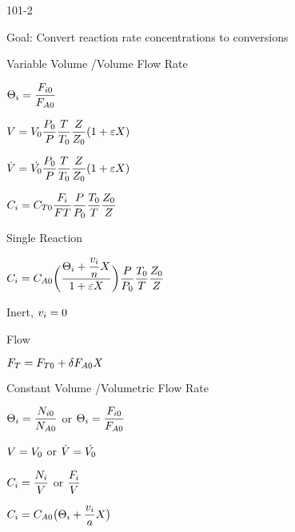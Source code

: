 \begin{mitframe}{101-2}
\begin{listone}
	\item Goal: Convert reaction rate concentrations to conversions
    \item Variable Volume /Volume Flow Rate
    	\begin{listtwo}
        	\item $\dimltemp_{\state}=\dfrac{\force_{\state\init}}{\force_{\helmholtz\init}}$
            \item $\vol=\vol_{\init}\dfrac{\p_{\init}}{\p}\dfrac{\Temp}{\Temp_{\init}}\dfrac{\compress}{\compress_{\init}}(1+\varepsilon{X})$
            \item $\dot{\vol}=\dot{\vol_{\init}}\dfrac{\p_{\init}}{\p}\dfrac{\Temp}{\Temp_{\init}}\dfrac{\compress}{\compress_{\init}}(1+\varepsilon{X})$
            \item $\conc_{\state}=\conc_{\Temp\init}\dfrac{\force_{\state}}{\force\Temp}\dfrac{\p}{\p_{\init}}\dfrac{\Temp_{\init}}{\Temp}\dfrac{\compress_{\init}}{\compress}$
            \begin{listthree}
            		\item Single Reaction
                    \item $\conc_{\state}=\conc_{\helmholtz\init}\bigg(
            \dfrac{\dimltemp_{\state}+\dfrac{\vvel_{\state}}{n}X}{1+\varepsilon{X}}\bigg)\dfrac{\p}{\p_{\init}}\dfrac{\Temp_{\init}}{\Temp}\dfrac{\compress_{\init}}{\compress}$
                \begin{listfour}
                	\item Inert, $\vvel_{\state}=0$
                \end{listfour}
            \end{listthree}
        	\item Flow
            	\begin{listthree}
                	\item $\force_{\Temp}=\force_{\Temp\init}+\blthick\force_{\helmholtz\init}X$
                \end{listthree}
        \end{listtwo}
	\item Constant Volume /Volumetric Flow Rate
    	\begin{listtwo}
        	\item $\dimltemp_{\state}=\dfrac{\nummoles_{\state\init}}{\nummoles_{\helmholtz\init}}$ or $\dimltemp_{\state}=\dfrac{\force_{\state\init}}{\force_{\helmholtz\init}}$
            \item $\vol=\vol_{\init}$ or $\dot{\vol}=\dot{\vol_{\init}}$
            \item $\conc_{\state}=\dfrac{\nummoles_{\state}} 
            {\vol}$ or $\dfrac{\force_{\state}}{\vol}$
            \item  $\conc_{\state}=\conc_{\helmholtz\init}\big(\dimltemp_{\state}+\dfrac{\vvel_{\state}}{\activity}X\big)$
            

\end{listtwo}
\end{listone}
\end{mitframe}

